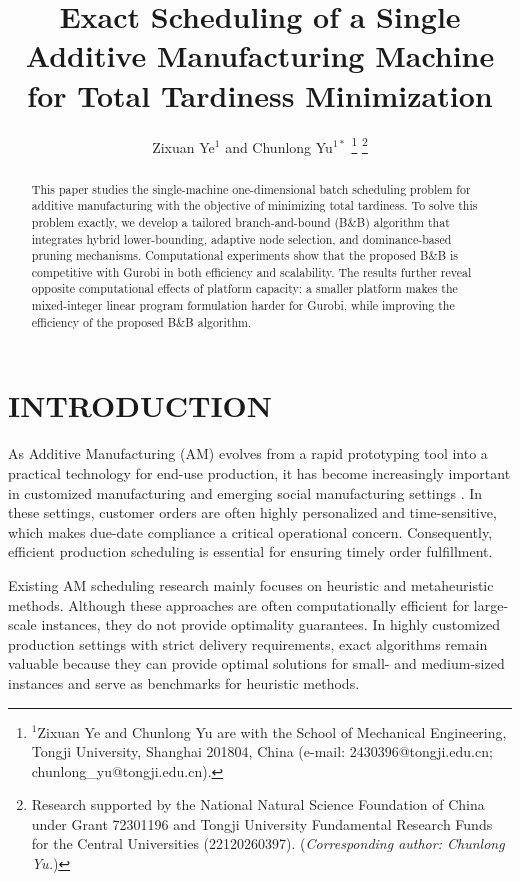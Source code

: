 \documentclass[letterpaper, 10 pt, conference]{ieeeconf}  %
\title{\LARGE \bf
Exact Scheduling of a Single Additive Manufacturing Machine for Total Tardiness Minimization
}
\author{Zixuan Ye$^{1}$ and Chunlong Yu$^{1*}$%
\thanks{$^{1}$Zixuan Ye and Chunlong Yu are with the School of Mechanical Engineering, Tongji University, Shanghai 201804, China (e-mail: 2430396@tongji.edu.cn; chunlong\_yu@tongji.edu.cn).}
\thanks{Research supported by the National Natural Science Foundation of China under Grant 72301196 and Tongji University Fundamental Research Funds for the Central Universities (22120260397). (\textit{Corresponding author: Chunlong Yu.})}
}
\begin{document}
\setlength{\abovedisplayskip}{4pt}
\setlength{\belowdisplayskip}{4pt}
\setlength{\abovedisplayshortskip}{2pt}
\setlength{\belowdisplayshortskip}{2pt}


\maketitle
\thispagestyle{empty}
\pagestyle{empty}

\begin{abstract}
This paper studies the single-machine one-dimensional batch scheduling problem for additive manufacturing with the objective of minimizing total tardiness. To solve this problem exactly, we develop a tailored branch-and-bound (B\&B) algorithm that integrates hybrid lower-bounding, adaptive node selection, and dominance-based pruning mechanisms. Computational experiments show that the proposed B\&B is competitive with Gurobi in both efficiency and scalability. The results further reveal opposite computational effects of platform capacity: a smaller platform makes the mixed-integer linear program formulation harder for Gurobi, while improving the efficiency of the proposed B\&B algorithm.
\end{abstract}


\section{INTRODUCTION}
As Additive Manufacturing (AM) evolves from a rapid prototyping tool into a practical technology for end-use production, it has become increasingly important in customized manufacturing and emerging social manufacturing settings \cite{pintoNestingSchedulingOptimization2024}\cite{wuNestingSchedulingParallel2025}. In these settings, customer orders are often highly personalized and time-sensitive, which makes due-date compliance a critical operational concern. Consequently, efficient production scheduling is essential for ensuring timely order fulfillment.

Existing AM scheduling research mainly focuses on heuristic and metaheuristic methods. Although these approaches are often computationally efficient for large-scale instances, they do not provide optimality guarantees. In highly customized production settings with strict delivery requirements, exact algorithms remain valuable because they can provide optimal solutions for small- and medium-sized instances and serve as benchmarks for heuristic methods.
\end{document}
